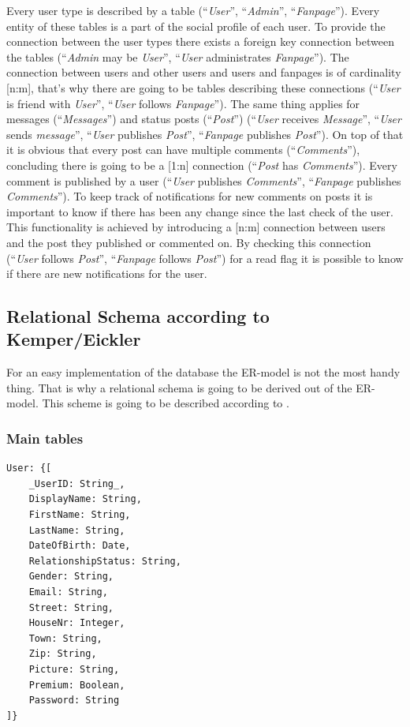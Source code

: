 \documentclass[11pt,a4paper]{report}
\begin{document}
Every user type is described by a table (\enquote{\emph{User}}, \enquote{\emph{Admin}}, \enquote{\emph{Fanpage}}). Every entity of these tables is a part of the social profile of each user. To provide the connection between the user types there exists a foreign key connection between the tables (\enquote{\emph{Admin} may be \emph{User}}, \enquote{\emph{User} administrates \emph{Fanpage}}). The connection between users and other users and users and fanpages is of cardinality [n:m], that's why there are going to be tables describing these connections (\enquote{\emph{User} is friend with \emph{User}}, \enquote{\emph{User} follows \emph{Fanpage}}). The same thing applies for messages (\enquote{\emph{Messages}}) and status posts (\enquote{\emph{Post}}) (\enquote{\emph{User} receives \emph{Message}}, \enquote{\emph{User} sends \emph{message}}, \enquote{\emph{User} publishes \emph{Post}}, \enquote{\emph{Fanpage} publishes \emph{Post}}). On top of that it is obvious that every post can have multiple comments (\enquote{\emph{Comments}}), concluding there is going to be a [1:n] connection (\enquote{\emph{Post} has \emph{Comments}}). Every comment is published by a user (\enquote{\emph{User} publishes \emph{Comments}}, \enquote{\emph{Fanpage} publishes \emph{Comments}}). To keep track of notifications for new comments on posts it is important to know if there has been any change since the last check of the user. This functionality is achieved by introducing a [n:m] connection between users and the post they published or commented on. By checking this connection (\enquote{\emph{User} follows \emph{Post}}, \enquote{\emph{Fanpage} follows \emph{Post}}) for a read flag it is possible to know if there are new notifications for the user. 

\subsection{Relational Schema according to Kemper/Eickler}
\label{sec:relSchema}
For an easy implementation of the database the ER-model is not the most handy thing. That is why a relational schema is going to be derived out of the ER-model. This scheme is going to be described according to \textcite{Kemper:2006aa}.
\pagebreak
\subsubsection{Main tables}
\begin{lstlisting}[frame=single, caption=\emph{User}-table, keepspaces=true, breaklines=true]
User: {[
    _UserID: String_,  
    DisplayName: String, 
    FirstName: String, 
    LastName: String, 
    DateOfBirth: Date, 
    RelationshipStatus: String, 
    Gender: String,
    Email: String, 
    Street: String, 
    HouseNr: Integer, 
    Town: String, 
    Zip: String, 
    Picture: String, 
    Premium: Boolean, 
    Password: String
]}
\end{lstlisting}
\end{document}
